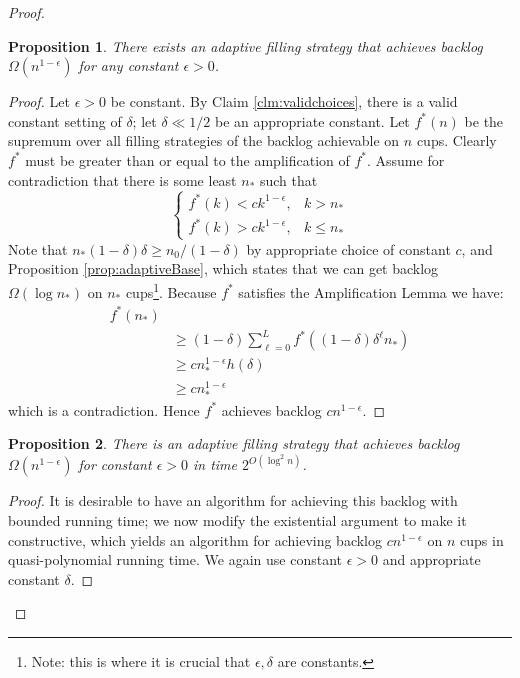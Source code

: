 \documentclass[twocolumn]{article}[10pt]
\newtheorem{proposition}{Proposition}
\begin{document}
\begin{proof}
  \begin{proposition}
    There exists an adaptive filling strategy that achieves backlog
    $\Omega(n^{1-\epsilon})$ for any constant $\epsilon > 0$.
  \end{proposition}
  \begin{proof}
  Let $\epsilon > 0$ be constant. By Claim \ref{clm:validchoices}, there is a
  valid constant setting of $\delta$; let $\delta \ll 1/2$ be an appropriate
  constant. Let $f^*(n)$ be the supremum over all filling strategies of the
  backlog achievable on $n$ cups. Clearly $f^*$ must be greater than or equal to
  the amplification of $f^*$. Assume for contradiction that there is some least
  $n_*$ such that 
  $$\begin{cases}
    f^*(k)< ck^{1-\epsilon}, & k > n_*\\
    f^*(k)> ck^{1-\epsilon}, & k \le n_*
  \end{cases} $$
  Note that $n_*(1-\delta)\delta \ge n_0/(1-\delta)$ by appropriate choice of constant
  $c$, and Proposition \ref{prop:adaptiveBase}, which states that we can get
  backlog $\Omega(\log n_*)$ on $n_*$ cups\footnote{Note: this is where it is
  crucial that $\epsilon, \delta$ are constants.}.
  Because $f^*$ satisfies the Amplification Lemma we have:
\begin{align*}
  f^*(n_*) & \\
           &\ge (1-\delta)\sum_{\ell=0}^L f^*((1-\delta)\delta^\ell n_*) \\
           &\ge cn_*^{1-\epsilon} h(\delta)\\
           &\ge cn_*^{1-\epsilon}
\end{align*}
which is a contradiction. Hence $f^*$ achieves backlog $cn^{1-\epsilon}$.
    
  \end{proof}

  \begin{proposition}
    \label{prop:constructive_nepsil}
    There is an adaptive filling strategy that achieves backlog
    $\Omega(n^{1-\epsilon})$ for constant $\epsilon > 0$ in time $2^{O(\log^2 n)}$.
  \end{proposition}
  \begin{proof}
It is desirable to have an algorithm for achieving this backlog with bounded
running time; we now modify the existential argument to make it constructive, 
which yields an algorithm for achieving backlog $cn^{1-\epsilon}$ on $n$ cups 
in quasi-polynomial running time. We again use constant $\epsilon > 0$ and appropriate constant $\delta$.


\end{proof}
\end{proof}
\end{document}
